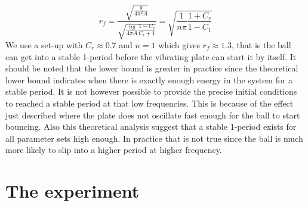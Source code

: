 \documentclass[12pt,oneside,a4paper]{article}
\numberwithin{equation}{section}
\begin{document}
{{{{\begin{equation}
	r_f=\frac{\sqrt{\frac{g}{4\pi^2A}}}{\sqrt{\frac{ng}{4\pi A}\frac{1-C_r}{C_r+1}}} = \sqrt{\frac{1}{n\pi} \frac{1+C_r}{1-C_1}}
\end{equation}
We use a set-up with $C_r\approx 0.7$ and $n=1$ which gives $r_f\approx1.3$, that is the ball can get into a stable 1-period before the vibrating plate can start it by itself. It should be noted that the lower bound is greater in practice since the theoretical lower bound indicates when there is exactly enough energy in the system for a stable period. It is not however possible to provide the precise initial conditions to reached a stable period at that low frequencies. This is because of the effect just described where the plate does not oscillate fast enough for the ball to start bouncing. Also this theoretical analysis suggest that a stable 1-period exists for all parameter sets high enough. In practice that is not true since the ball is much more likely to slip into a higher period at higher frequency. 

\section{The experiment}
}}}}
\end{document}
